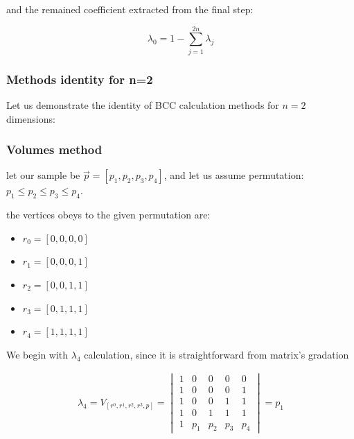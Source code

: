 		and the remained coefficient extracted from the final step:
		
		\begin{equation}
		\lambda_0 = 1 - \sum_{j=1}^{2n} \lambda_j
		\end{equation}		
		
		
		
		\subsubsection{Methods identity for n=2}
		
		Let us demonstrate the identity of BCC calculation methods for $n=2$ dimensions:
			
		
		\subsubsection{Volumes method}
		
		let our sample be $\overrightarrow{p}=[p_1,p_2,p_3,p_4]$, and let us assume permutation: \\ 
		$p_1 \leq p_2 \leq p_3\leq p_4$.

		the vertices obeys to the given permutation are:
		
		\begin{itemize}
		\item $r_0 = [0,0,0,0]$
		\item $r_1 = [0,0,0,1]$
		\item $r_2 = [0,0,1,1]$
		\item $r_3 = [0,1,1,1]$
		\item $r_4 = [1,1,1,1]$
		\end{itemize}
		
		We begin with $\lambda_4$ calculation, since it is straightforward from matrix’s gradation
		
		
		\begin{equation}
		\begin{align*}
			\lambda_4 = V_{[r^0,r^1,r^2,r^3,p]} = 
			\begin{vmatrix}
				1 & 0 & 0 & 0 & 0\\ 
				1 & 0 & 0 & 0 & 1\\ 
				1 &  0  & 0 & 1 & 1 \\ 
				1 & 0 & 1 & 1 & 1\\ 
				1 & p_{1} &  p_{2}& p_{3} & p_{4}
				\end{vmatrix} = p_1				
		\end{align*}		
		\end{equation}
		
